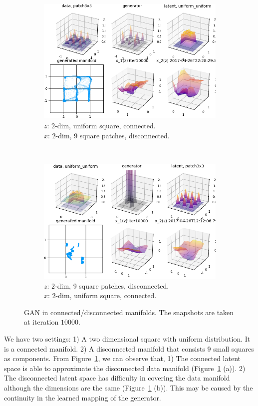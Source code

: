 \begin{figure}[ht]
\centering
    \begin{subfigure}[t]{0.45\textwidth}
        \includegraphics[width=\linewidth]{"fig/uniformuniform_patch3x3_000100"}
        \caption{$z$: $2$-dim, uniform square, connected.\\
            $x$: $2$-dim, 9 square patches, disconnected.}
    \end{subfigure}
    ~
    \begin{subfigure}[t]{0.45\textwidth}
        \includegraphics[width=\linewidth]{"fig/patch3x3_uniformuniform_000100"}
        \caption{$z$: $2$-dim, 9 square patches, disconnected.\\
            $x$: $2$-dim, uniform square, connected.}
    \end{subfigure}
    \caption{\small
        GAN in connected/disconnected manifolds.
        The snapshots are taken at iteration $10000$.
        }
    \label{fig:conn}
\end{figure}

We have two settings:
1) A two dimensional square with uniform distribution.
It is a connected manifold.
2) A disconnected manifold that consists 9 small squares as components.
From Figure~\ref{fig:conn},
we can observe that,
1) The connected latent space is able to approximate the disconnected
data manifold (Figure~\ref{fig:conn} (a)).
2) The disconnected latent space has difficulty in covering
the data manifold although the dimensions are the same
(Figure~\ref{fig:conn} (b)).
This may be caused by the continuity in the learned mapping
of the generator.
